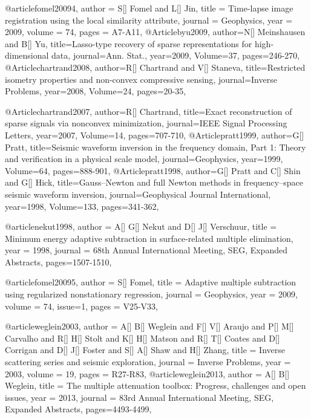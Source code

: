 @article{fomel20094,
  author =	 {S[] Fomel and L[] Jin},
  title =	 {Time-lapse image registration using the local similarity attribute},
  journal = 	 {Geophysics},
  year = 	 2009,
  volume =	 74,
  pages =	 {A7-A11},
}
@Article{byu2009,
  author={N[] Meinshausen and B[] Yu},
  title={Lasso-type recovery of sparse representations for high-dimensional data},
  journal={Ann. Stat.},
  year=2009,
  Volume=37,
  pages={246-270},
}
@Article{chartrand2008,
  author={R[] Chartrand and V[] Staneva},
  title={Restricted isometry properties and non-convex compressive sensing},
  journal={Inverse Problems},
  year=2008,
  Volume=24,
  pages={20-35},
}

@Article{chartrand2007,
  author={R[] Chartrand},
  title={Exact reconstruction of sparse signals via nonconvex minimization},
  journal={IEEE Signal Processing Letters},
  year=2007,
  Volume=14,
  pages={707-710},
}
@Article{pratt1999,
  author={G[] Pratt},
  title={Seismic waveform inversion in the frequency domain, Part 1: Theory and verification in a physical scale model},
  journal={Geophysics},
  year=1999,
  Volume=64,
  pages={888-901},
}
@Article{pratt1998,
  author={G[] Pratt and C[] Shin and G[] Hick},
  title={Gauss–Newton and full Newton methods in frequency–space seismic waveform inversion},
  journal={Geophysical Journal International},
  year=1998,
  Volume=133,
  pages={341-362},
}

@article{nekut1998,
  author =	 {A[] G[] Nekut and D[] J[] Verschuur},
  title =	 {Minimum energy adaptive subtraction in surface-related multiple elimination},
  year =	 1998,
  journal =	 {68th Annual International Meeting, SEG, Expanded Abstracts},
 pages=1507-1510,
}

@article{fomel20095,
  author =	 {S[] Fomel},
  title =	 {Adaptive multiple subtraction using regularized nonstationary regression},
  journal = 	 {Geophysics},
  year = 	 2009,
  volume =	 74,
  issue=1,
  pages =	 {V25-V33},
}

@article{weglein2003,
  author =	 {A[] B[] Weglein and F[] V[] Araujo and P[] M[] Carvalho and R[] H[] Stolt and K[] H[] Matson and R[] T[] Coates and D[] Corrigan and D[] J[] Foster and S[] A[] Shaw and H[] Zhang},
  title =	 {Inverse scattering series and seismic exploration},
  journal = 	 {Inverse Problems},
  year = 	 2003,
  volume =	 19,
  pages =	 {R27-R83},
}
@article{weglein2013,
  author =	 {A[] B[] Weglein},
  title =	 {The multiple attenuation toolbox: Progress, challenges and open issues},
  year =	 2013,
  journal =	 {83rd Annual International Meeting, SEG, Expanded Abstracts},
 pages=4493-4499,
}


